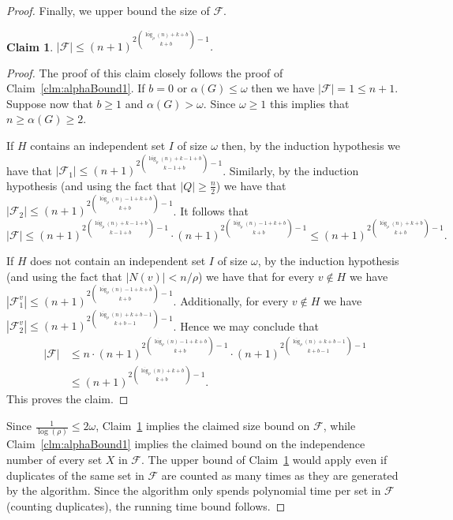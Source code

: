 \documentclass[11pt]{amsart}
\newtheorem{claim}{Claim}[theorem]
\newcommand{\cal}{\mathcal}
\newcounter{tbox}
\newcommand{\sta}[1]{\vspace*{0.3cm}\refstepcounter{tbox}\noindent{ \parbox{\textwidth}{(\thetbox) \emph{#1}}}\vspace*{0.3cm}}
\begin{document}
\begin{proof}
Finally, we upper bound the size of ${\cal F}$.
\begin{claim}\label{clm:FBound1}
$|{\cal F}| \leq (n+1)^{ 2 {\overline{\log}_\rho(n) + k+b \choose k+b} - 1}$.
\end{claim}

\begin{proof}
The proof of this claim closely follows the proof of Claim~\ref{clm:alphaBound1}.
%
If $b=0$ or $\alpha(G) \leq \omega$ then we have $|{\cal F}| = 1 \leq n+1$. Suppose now that $b \geq 1$ and $\alpha(G) > \omega$. Since $\omega \geq 1$ this implies that $n \geq \alpha(G) \geq 2$. 

If $H$ contains an independent set $I$ of size $\omega$ then, by the induction hypothesis we have that $|{\cal F}_1| \leq (n+1)^{2 {\overline{\log}_\rho(n) + k-1+b \choose k-1+b} - 1}$.
%
Similarly, by the induction hypothesis (and using the fact that $|Q| \geq \frac{n}{2}$) we have that $|{\cal F}_2| \leq (n+1)^{2 {\overline{\log}_\rho(n)-1 + k+b \choose k+b} - 1}$.
%
It follows that
$$|{\cal F}| \leq 
(n+1)^{2 {\overline{\log}_\rho(n) + k-1+b \choose k-1+b} - 1} \cdot
(n+1)^{2 {\overline{\log}_\rho(n)-1 + k+b \choose k+b} - 1}
\leq
(n+1)^{ 2 {\overline{\log}_\rho(n) + k+b \choose k+b} - 1 }.
$$


If $H$ does not contain an independent set $I$ of size $\omega$, by the induction hypothesis (and using the fact that $|N(v)| < n/\rho$) we have that for every $v \notin H$ we have 
$|{\cal F}_1^v| \leq (n+1)^{2 {\overline{\log}_\rho(n) - 1 + k+b \choose k+b} - 1}$. Additionally, for every $v \notin H$ we have $|{\cal F}_2^v| \leq (n+1)^{2 {\overline{\log}_\rho(n) + k+b-1 \choose k+b-1} - 1}$. Hence we may conclude that  
\begin{align*}
|{\cal F}| & \leq 
n \cdot
(n+1)^{2 {\overline{\log}_\rho(n) - 1 + k+b \choose k+b} - 1} \cdot
(n+1)^{2 {\overline{\log}_\rho(n) + k+b-1 \choose k+b-1} - 1}\\
& \leq(n+1)^{ 2 {\overline{\log}_\rho(n) + k+b \choose k+b} - 1 } \mbox{.}
\end{align*}
%
This proves the claim.
\end{proof}

Since $\frac{1}{\log(\rho)} \leq 2\omega$, Claim~\ref{clm:FBound1} implies the claimed size bound on ${\cal F}$, while Claim~\ref{clm:alphaBound1} implies the claimed bound on the independence number of every set $X$ in ${\cal F}$. 
%
The upper bound of Claim~\ref{clm:FBound1} would apply even if duplicates of the same set in ${\cal F}$ are counted as many times as they are generated by the algorithm. Since the algorithm only spends polynomial time per set in ${\cal F}$ (counting duplicates), the running time bound follows.
\end{proof}
\end{document}

